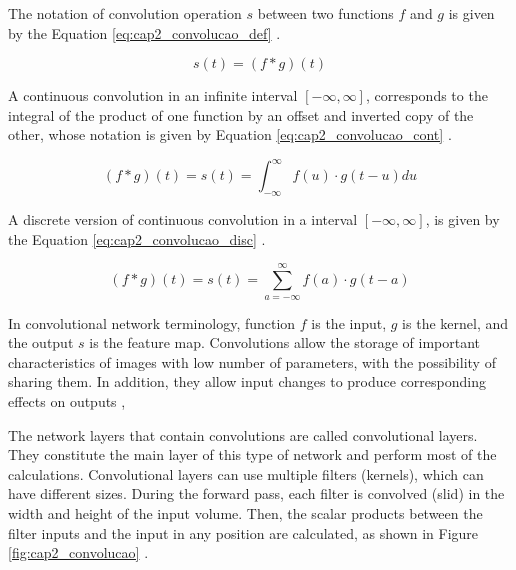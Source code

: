 The notation of convolution operation $s$ between two functions $f$ and $g$ is given by the Equation \ref{eq:cap2_convolucao_def} \cite[Ch. 9]{Goodfellow2016}.

\begin{equation}
 s(t) = (f * g)(t)
 \label{eq:cap2_convolucao_def}
\end{equation}

A continuous convolution in an infinite interval $[{-}\infty, \infty]$, corresponds to the integral of the product of one function by an offset and inverted copy of the other, whose notation is given by Equation \ref{eq:cap2_convolucao_cont} \cite{ConvolutionMathWorld:2018}.

\begin{equation}
 (f * g)(t) = s(t) = \int_{{-}\infty}^{\infty} f(u) \cdot g(t-u)du
 \label{eq:cap2_convolucao_cont}
\end{equation}

A discrete version of continuous convolution in a interval $[{-}\infty, \infty]$, is given by the Equation \ref{eq:cap2_convolucao_disc} \cite[Ch. 9]{Goodfellow2016}.

\begin{equation}
 (f * g)(t) = s(t) = \sum_{a={-}\infty}^{\infty} f(a) \cdot g(t-a)
 \label{eq:cap2_convolucao_disc}
\end{equation}

In convolutional network terminology, function $f$ is the input, $g$ is the kernel, and the output $s$ is the feature map.
Convolutions allow the storage of important characteristics of images with low number of parameters, with the possibility of sharing them.
In addition, they allow input changes to produce corresponding effects on outputs \cite[Ch. 9]{Goodfellow2016}, 

The network layers that contain convolutions are called convolutional layers. 
They constitute the main layer of this type of network and perform most of the calculations.
Convolutional layers can use multiple filters (kernels), which can have different sizes.
During the forward pass, each filter is convolved (slid) in the width and height of the input volume.
Then, the scalar products between the filter inputs and the input in any position are calculated, as shown in Figure \ref{fig:cap2_convolucao} \cite[Ch. 9]{Goodfellow2016} \cite{OShea:2015}.

